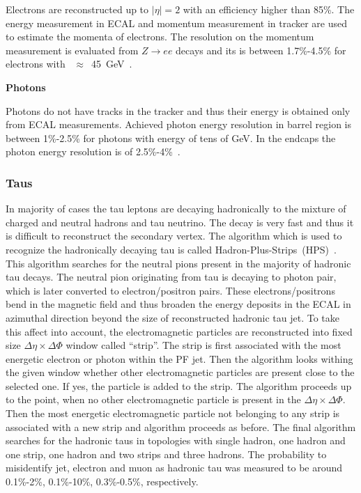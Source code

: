 Electrons are reconstructed up to $|\eta|=2$ with an efficiency higher than 85\%. The energy measurement in ECAL and momentum measurement in tracker are used to estimate the momenta of electrons. The resolution on the momentum measurement is evaluated from $Z \rightarrow ee$ decays and its is between 1.7\%-4.5\% for electrons with  \pt~$\approx$~45~GeV~\cite{Khachatryan:2015hwa}.

\textbf{Photons}

Photons do not have tracks in the tracker and thus their energy is obtained only from ECAL measurements. Achieved photon energy resolution in barrel region is between 1\%-2.5\% for photons with energy of tens of GeV. In the endcaps the photon energy resolution is of 2.5\%-4\%~\cite{CMS:EGM-14-001}.


\subsubsection{Taus}

In majority of cases the tau leptons are decaying hadronically to the mixture of charged and neutral hadrons and tau neutrino. The decay is very fast and thus it is difficult to reconstruct the secondary vertex. The algorithm which is used to recognize the hadronically decaying tau is called Hadron-Plus-Strips~(HPS)~\cite{CMS:2016gvn}. This algorithm searches for the neutral pions present in the majority of hadronic tau decays. The neutral pion originating from tau is  decaying to photon pair, which is later converted to electron/positron pairs. These electrons/positrons bend in the magnetic field and thus broaden the energy deposits in the ECAL in azimuthal direction beyond the size of reconstructed hadronic tau jet. To take this affect into account, the electromagnetic particles  are reconstructed into fixed size $\Delta \eta \times \Delta \Phi$ window called ``strip''. The strip is first associated with the most energetic electron or photon within the PF jet. Then the algorithm looks withing the given window whether other electromagnetic particles are present close to the selected one. If yes, the particle is added to the strip. The algorithm proceeds up to the point, when no other electromagnetic particle is present in the $\Delta \eta \times \Delta \Phi$. Then the most energetic electromagnetic particle not belonging to any strip is associated with a new strip and algorithm proceeds as before. The final algorithm searches for the hadronic taus in topologies with single hadron, one hadron and one strip, one hadron and two strips and three hadrons. The probability to misidentify jet, electron and muon as hadronic tau was measured to be around 0.1\%-2\%, 0.1\%-10\%, 0.3\%-0.5\%, respectively.


